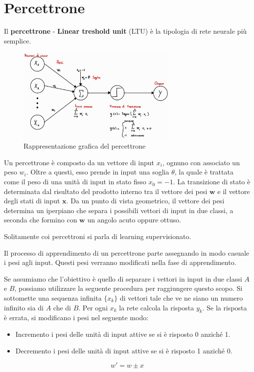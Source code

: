 \section{Percettrone}
Il \textbf{percettrone} - \textbf{Linear treshold unit} (LTU) è la tipologia di
rete neurale più semplice.
\begin{figure}[!ht]
    \centering
    \includegraphics[width=0.7\textwidth]{img/reti/percettrone.png}
    \caption{Rappresentazione grafica del percettrone}
\end{figure}

Un percettrone è composto da un vettore di input $x_i$, ognuno con associato un
peso $w_i$. Oltre a questi, esso prende in input una soglia $\theta$, la quale è
trattata come il peso di una unità di input in stato fisso $x_0 = -1$. La transizione
di stato è determinata dal risultato del prodotto interno tra il vettore dei
pesi $\textbf{w}$ e il vettore degli stati di input $\textbf{x}$. Da un punto di
vista geometrico, il vettore dei pesi determina un iperpiano che separa i possibili
vettori di input in due classi, a seconda che formino con $\textbf{w}$ un angolo
acuto oppure ottuso.

Solitamente coi percettroni si parla di learning supervisionato.

Il processo di apprendimento di un percettrone parte assegnando in modo casuale
i pesi agli input. Questi pesi verranno modificati nella fase di apprendimento.

Se assumiamo che l'obiettivo è quello di separare i vettori in input in due classi
$A$ e $B$, possiamo utilizzare la seguente procedura per raggiungere questo scopo.
Si sottomette una sequenza infinita $\{x_k\}$ di vettori tale che ve ne siano un
numero infinito sia di $A$ che di $B$. Per ogni $x_k$ la rete calcola la risposta
$y_k$. Se la risposta è errata, si modificano i pesi nel seguente modo:
\begin{itemize}
    \item Incremento i pesi delle unità di input attive se si è risposto 0 anziché 1.
    \item Decremento i pesi delle unità di input attive se si è risposto 1 anziché 0.
\end{itemize}
\begin{equation}
    w' = w \pm x
\end{equation}

